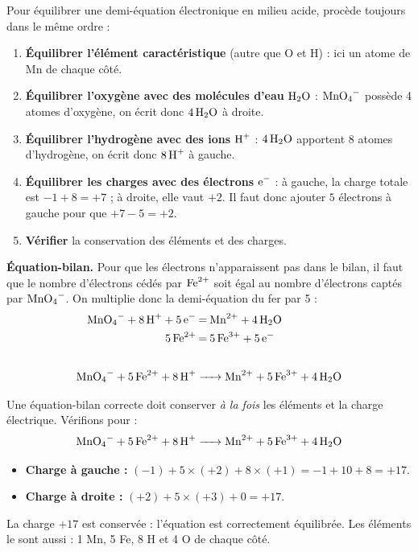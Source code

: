 \documentclass[11pt]{article}
\begin{document}
\begin{methode}
Pour équilibrer une demi-équation électronique en milieu acide, procède toujours dans le même ordre :
\begin{enumerate}
\item \textbf{Équilibrer l'élément caractéristique} (autre que O et H) : ici un atome de Mn de chaque côté.
\item \textbf{Équilibrer l'oxygène avec des molécules d'eau} $\ce{H2O}$ : $\ce{MnO4-}$ possède 4 atomes d'oxygène, on écrit donc $4\,\ce{H2O}$ à droite.
\item \textbf{Équilibrer l'hydrogène avec des ions} $\ce{H+}$ : $4\,\ce{H2O}$ apportent 8 atomes d'hydrogène, on écrit donc $8\,\ce{H+}$ à gauche.
\item \textbf{Équilibrer les charges avec des électrons} $\ce{e-}$ : à gauche, la charge totale est $-1 + 8 = +7$ ; à droite, elle vaut $+2$. Il faut donc ajouter $5$ électrons à gauche pour que $+7 - 5 = +2$.
\item \textbf{Vérifier} la conservation des éléments et des charges.
\end{enumerate}
\end{methode}

\textbf{Équation-bilan.} Pour que les électrons n'apparaissent pas dans le bilan, il faut que le nombre d'électrons cédés par $\ce{Fe^2+}$ soit égal au nombre d'électrons captés par $\ce{MnO4-}$. On multiplie donc la demi-équation du fer par 5 :
\begin{align*}
\ce{MnO4- + 8H+ + 5e-} &\ce{= Mn^2+ + 4H2O} \\
\ce{5 Fe^2+} &\ce{= 5 Fe^3+ + 5 e-} \\ \intertext{\hrulefill}
\ce{MnO4- + 5Fe^2+ + 8H+} &\ce{-> Mn^2+ + 5Fe^3+ + 4H2O}
\end{align*}

\begin{exemplebox}
Une équation-bilan correcte doit conserver \emph{à la fois} les éléments et la charge électrique. Vérifions pour :
\[ \ce{MnO4- + 5Fe^2+ + 8H+ -> Mn^2+ + 5Fe^3+ + 4H2O} \]
\begin{itemize}
\item \textbf{Charge à gauche :} $(-1) + 5\times(+2) + 8\times(+1) = -1 + 10 + 8 = +17$.
\item \textbf{Charge à droite :} $(+2) + 5\times(+3) + 0 = +17$.
\end{itemize}
La charge $+17$ est conservée : l'équation est correctement équilibrée. Les éléments le sont aussi : 1 Mn, 5 Fe, 8 H et 4 O de chaque côté.
\end{exemplebox}
\end{document}
